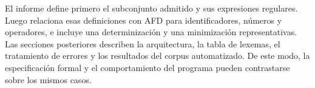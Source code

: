 El informe define primero el subconjunto admitido y sus expresiones regulares. Luego relaciona esas definiciones con AFD para identificadores, números y operadores, e incluye una determinización y una minimización representativas. Las secciones posteriores describen la arquitectura, la tabla de lexemas, el tratamiento de errores y los resultados del corpus automatizado. De este modo, la especificación formal y el comportamiento del programa pueden contrastarse sobre los mismos casos.
